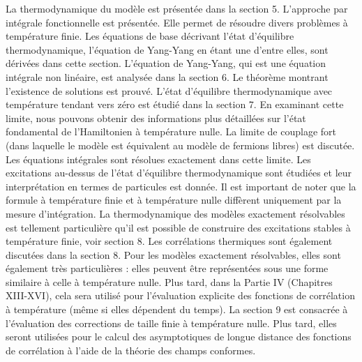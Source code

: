{\color{red} La thermodynamique du modèle est présentée dans la section 5. L'approche par intégrale fonctionnelle est présentée. Elle permet de résoudre divers problèmes à température finie. Les équations de base décrivant l'état d'équilibre thermodynamique, l'équation de Yang-Yang en étant une d'entre elles, sont dérivées dans cette section. L'équation de Yang-Yang, qui est une équation intégrale non linéaire, est analysée dans la section 6. Le théorème montrant l'existence de solutions est prouvé.} L'état d'équilibre thermodynamique avec température tendant vers zéro est étudié dans la section 7. En examinant cette limite, nous pouvons obtenir des informations plus détaillées sur l'état fondamental de l'Hamiltonien à température nulle. La limite de couplage fort (dans laquelle le modèle est équivalent au modèle de fermions libres) est discutée. Les équations intégrales sont résolues exactement dans cette limite. Les excitations au-dessus de l'état d'équilibre thermodynamique sont étudiées et leur interprétation en termes de particules est donnée. Il est important de noter que la formule à température finie et à température nulle diffèrent uniquement par la mesure d'intégration. La thermodynamique des modèles exactement résolvables est tellement particulière qu'il est possible de construire des excitations stables à température finie, voir section 8. Les corrélations thermiques sont également discutées dans la section 8. Pour les modèles exactement résolvables, elles sont également très particulières : elles peuvent être représentées sous une forme similaire à celle à température nulle. Plus tard, dans la Partie IV (Chapitres XIII-XVI), cela sera utilisé pour l'évaluation explicite des fonctions de corrélation à température (même si elles dépendent du temps). La section 9 est consacrée à l'évaluation des corrections de taille finie à température nulle. Plus tard, elles seront utilisées pour le calcul des asymptotiques de longue distance des fonctions de corrélation à l'aide de la théorie des champs conformes.